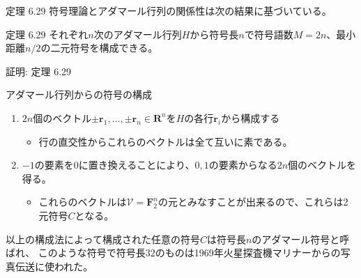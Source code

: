 \documentclass[dvipdfmx,10pt,jsarticle]{beamer}
\begin{document}
  \begin{frame}{定理 6.29}
    符号理論とアダマール行列の関係性は次の結果に基づいている。
    \begin{block}{定理 6.29}
      それぞれ$n$次のアダマール行列$H$から符号長$n$で符号語数$M = 2n$、最小距離$n/2$の二元符号を構成できる。
    \end{block}

  \end{frame}

  \begin{frame}{証明: 定理 6.29}
      \begin{block}{アダマール行列からの符号の構成}
        \begin{enumerate}
          \item $2n$個のベクトル$\pm\mathbf{r}_1 , \ldots , \pm\mathbf{r}_n \in \mathbf{R}^n$を$H$の各行$\mathbf{r}_i$から構成する
            \begin{itemize}
              \item 行の直交性からこれらのベクトルは全て互いに素である。
            \end{itemize}
          \item $-1$の要素を$0$に置き換えることにより、$0, 1$の要素からなる$2n$個のベクトルを得る。
            \begin{itemize}
              \item これらのベクトルは$\mathcal{V} = \mathbf{F}_2^n$の元とみなすことが出来るので、これらは2元符号$C$となる。
            \end{itemize}
        \end{enumerate}
      \end{block}
        以上の構成法によって構成された任意の符号$C$は符号長$n$のアダマール符号と呼ばれ、
        このような符号で符号長$32$のものは1969年火星探査機マリナーからの写真伝送に使われた。 \\
  \end{frame}
\end{document}
